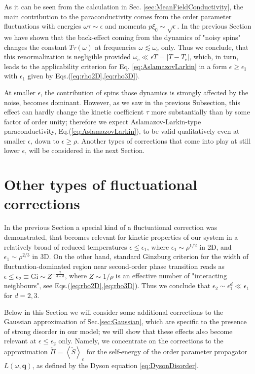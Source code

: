\documentclass[twocolumn,english,prb]{revtex4-1}
\begin{document}
As it can be seen from the calculation in Sec. \ref{sec:MeanFieldConductivity}, the main contribution to the paraconductivity comes from the order parameter fluctuations with energies $\omega \tau \sim \epsilon$ and momenta $p \xi_0 \sim \sqrt{\epsilon}$.  
In the previous Section we have shown that the back-effect coming from the dynamics of  "noisy spins"  changes the 
constant $T \tau(\omega)$ at frequencies $\omega \lesssim \omega_c$ only. Thus  we conclude, that this renormalization is negligible provided $\omega_c \ll \epsilon T = |T - T_c|$, which, in turn, leads to the applicability criterion for
 Eq. \eqref{eq:AslamazovLarkin} in a form $\epsilon \geq \epsilon_1$  with $\epsilon_1$ given by Eqs.(\ref{eq:rho2D},\ref{eq:rho3D}).
 
At smaller $\epsilon$, the contribution of spins those dynamics is strongly affected by the noise, becomes dominant.
However, as we saw in the previous Subsection, this effect can hardly change the kinetic coefficient $\tau$  more substantially
than by some factor of order unity; therefore we expect Aslamazov-Larkin-type  paraconductivity,  
Eq.(\ref{eq:AslamazovLarkin}), to be  valid qualitatively even at smaller $\epsilon$, down to $\epsilon \geq \rho$.
Another types of corrections that come into play at still lower $\epsilon$, will be considered in the next Section.




\section{Other types of fluctuational corrections}
\label{sec:RandomFieldCorrections}

In the previous Section a special kind of a fluctuational correction  was demonstrated, that becomes relevant for
kinetic properties of our system in a relatively broad of reduced temperatures $\epsilon \leq \epsilon_1$,
where $\epsilon_1 \sim \rho^{1/2}$ in 2D, and  $\epsilon_1 \sim \rho^{2/3}$ in 3D.
On the other hand,  standard Ginzburg criterion for the width of fluctuation-dominated region near second-order
phase transition reads as $\epsilon \leq \epsilon_2 \equiv \mathrm{Gi} \sim Z^{-\frac{2}{4-d}} $, where $Z \sim 1/\rho$ 
is an effective number of "interacting neighbours", see Eqs.(\ref{eq:rho2D},\ref{eq:rho3D}).
Thus  we conclude that  $ \epsilon_2 \sim \epsilon_1^d \ll \epsilon_1$ for $d=2,3$.

Below in this Section we will consider some additional corrections to the Gaussian approximation of 
Sec.\ref{sec:Gaussian}, which are specific to the presence of strong disorder 
in  our model; we will show that these effects also become relevant at  $\epsilon \leq \epsilon_2 $ only.
Namely, we concentrate on the corrections to the approximation
 $\check{\Pi} = \left\langle \check{S} \right\rangle_{\varepsilon}$
 for the self-energy of the order parameter propagator $L(\omega,\boldsymbol{q})$, as defined by the 
Dyson equation \eqref{eq:DysonDisorder}.
\end{document}
